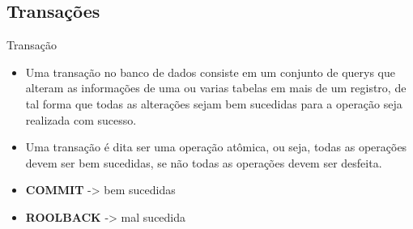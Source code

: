 	\subsection{Transações}

	\begin{frame}
	
	
	
	
	\begin{CaixaModelo01}{Transação}
	
	\begin{itemize}
		\item 		Uma transação no banco de dados consiste em um conjunto de querys
		que alteram as informações de uma ou varias tabelas em mais de um registro,
		de tal forma que todas as alterações sejam bem sucedidas para a operação seja
		realizada com sucesso.
		\item Uma transação é dita ser uma operação atômica, ou seja,  todas as operações devem ser bem sucedidas, 
		se não todas as operações devem ser desfeita.
		
		\item \textbf{COMMIT} -> bem sucedidas
		
		\item \textbf{ROOLBACK} -> mal sucedida
		
	\end{itemize}
		
		
%		
%		
%		
		
		
	\end{CaixaModelo01}

	\end{frame}